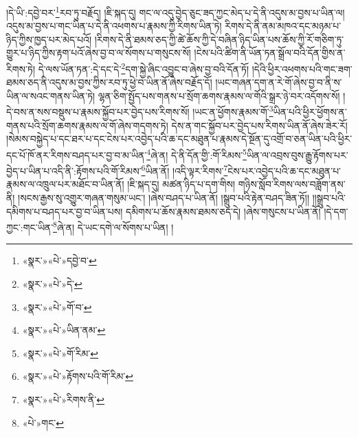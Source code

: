 །དེ་ཡི་:དབྱེ་བར་\footnote{«སྣར་»«པེ་»དབྱེ་བ་}རབ་ཏུ་བརྗོད། །ཇི་སྐད་དུ། གང་ལ་འདུ་བྱེད་ཅུང་ཟད་ཀྱང་མེད་པ་དེ་ནི་འདུས་མ་བྱས་པ་ཡིན་ལ། འདུས་མ་བྱས་པ་གང་ཡིན་པ་དེ་ནི་འཕགས་པ་རྣམས་ཀྱི་རིགས་ཡིན་ཏེ། རིགས་དེ་ནི་ནམ་མཁའ་དང་མཉམ་པ་ཉིད་ཀྱིས་ཁྱད་པར་མེད་པའོ། །རིགས་དེ་ནི་ཐམས་ཅད་ཀྱི་ཚེ་ཆོས་ཀྱི་དེ་བཞིན་ཉིད་ཡིན་པས་ཆོས་ཀྱི་རོ་གཅིག་ཏུ་གྱུར་པ་ཉིད་ཀྱིས་རྟག་པའོ་ཞེས་བྱ་བ་ལ་སོགས་པ་གསུངས་སོ། །ངེས་པའི་ཚིག་ནི་ཡོན་ཏན་སྒྲོལ་བའི་དོན་གྱིས་ན་རིགས་ཏེ། དེ་ལས་ཡོན་ཏན་:དེ་དང་དེ་\footnote{«སྣར་»«པེ་»དེ་}དག་སྐྱེ་ཞིང་འབྱུང་བ་ཞེས་བྱ་བའི་དོན་ཏོ། །དེའི་ཕྱིར་འཕགས་པའི་གང་ཟག་ཐམས་ཅད་ནི་འདུས་མ་བྱས་ཀྱིས་རབ་ཏུ་ཕྱེ་བ་ཡིན་ནོ་ཞེས་བརྗོད་དོ། །ཡང་གཞན་དག་ན་རེ་གོ་ཞེས་བྱ་བ་ནི་ས་ཡིན་ལ་སའང་གནས་ཡིན་ཏེ། ལྷན་ཅིག་སྤྱོད་པས་གནས་པ་སྲོག་ཆགས་རྣམས་ལ་གོའི་སྒྲར་ཉེ་བར་འདོགས་སོ། །དེ་བས་ན་སས་བསྡུས་པ་རྣམས་སྐྱོབ་པར་བྱེད་པས་རིགས་སོ། །ཡང་ན་ཕྱོགས་རྣམས་གོ་\footnote{«སྣར་»«པེ་»གོ་བ་}ཡིན་པའི་ཕྱིར་ཕྱོགས་ན་གནས་པའི་སྲོག་ཆགས་རྣམས་ལ་གོ་ཞེས་གདགས་ཏེ། དེས་ན་གང་སྐྱོབ་པར་བྱེད་པས་རིགས་ཡིན་ནོ་ཞེས་ཟེར་རོ། །སེམས་བསྐྱེད་པ་དང་ཐར་པ་དང་ངེས་པར་འབྱེད་པའི་ཆ་དང་མཐུན་པ་རྣམས་དེ་སྔོན་དུ་འགྲོ་བ་ཅན་ཡིན་པའི་ཕྱིར་དང་པོ་ཁོ་ནར་རིགས་བཤད་པར་བྱ་བ་མ་ཡིན་\footnote{«སྣར་»«པེ་»ཡིན་ནམ་}ཞེ་ན། དེ་ནི་དོན་གྱི་:གོ་རིམས་\footnote{«སྣར་»«པེ་»གོ་རིམ་}ཡིན་ལ་འབྲས་བུས་རྒྱུ་རྟོགས་པར་བྱེད་པ་ཡིན་པ་འདི་ནི་:རྟོགས་པའི་གོ་རིམས་\footnote{«སྣར་»«པེ་»རྟོགས་པའི་གོ་རིམ་}ཡིན་ནོ། །འདི་ལྟར་རིགས་\footnote{«སྣར་»«པེ་»རིགས་ནི་}ངེས་པར་འབྱེད་པའི་ཆ་དང་མཐུན་པ་རྣམས་ལ་འཁྲུལ་པར་མཐོང་བ་ཡིན་ནོ། །ཇི་སྐད་དུ། མཚན་ཉིད་པ་དག་གིས། གཉིས་སློབ་རིགས་ལས་བཟློག་ནས་ནི། །སངས་རྒྱས་སུ་འགྱུར་གཞན་གསུམ་ཡང་། །ཞེས་བཤད་པ་ཡིན་ནོ། །སྒྲུབ་པའི་རྟེན་བཤད་ཟིན་ཏོ།། །།སྒྲུབ་པའི་དམིགས་པ་བཤད་པར་བྱ་བ་ཡིན་པས། དམིགས་པ་ཆོས་རྣམས་ཐམས་ཅད་དེ། །ཞེས་གསུངས་པ་ཡིན་ནོ། །དེ་དག་ཀྱང་:གང་ཡིན་\footnote{«པེ་»གང་}ཞེ་ན། དེ་ཡང་དགེ་ལ་སོགས་པ་ཡིན། །
